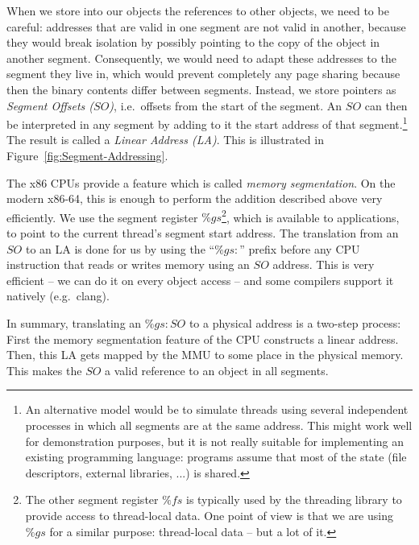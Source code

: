 \documentclass{sigplanconf}
\begin{document}
When we store into our objects the references to other objects, we
need to be careful: addresses that are valid in one segment are not
valid in another, because they would break isolation by possibly pointing to
the copy of the object in another segment.  Consequently, we would
need to adapt these addresses to the segment they live in, which would
prevent completely any page sharing because then the binary contents
differ between segments.  Instead, we store pointers as
\emph{Segment Offsets ($SO$)}, i.e.\ offsets from the start of the
segment.  An $SO$ can then be interpreted in any segment by adding to
it the start address of that segment.\footnote{An alternative model
would be to simulate threads using several independent processes in
which all segments are at the same address.  This might work well for
demonstration purposes, but it is not really suitable for implementing
an existing programming language: programs assume that most of the
state (file descriptors, external libraries, ...) is shared.} The
result is called a \emph{Linear Address (LA)}. This is illustrated in
Figure~\ref{fig:Segment-Addressing}.

The x86 CPUs provide a feature which is called \emph{memory
segmentation}.  On the modern x86-64, this is enough to perform the
addition described above very efficiently.  We use the segment
register $\%gs$\footnote{The other segment register $\%fs$ is
typically used by the threading library to provide access to
thread-local data.  One point of view is that we are using $\%gs$ for
a similar purpose: thread-local data -- but a lot of it.}, which is
available to applications, to point to the current thread's segment
start address.  The translation from an $SO$ to an LA is done for us by
using the ``$\%gs\colon$'' prefix before any CPU instruction that
reads or writes memory using an $SO$ address.  This is very efficient
-- we can do it on every object access -- and some compilers support it
natively (e.g.\ clang).

In summary, translating an $\%gs:SO$ to a physical address is a
two-step process: First the memory segmentation feature of the CPU
constructs a linear address. Then, this LA gets mapped by the MMU to
some place in the physical memory. This makes the $SO$ a valid reference
to an object in all segments.


\end{document}
